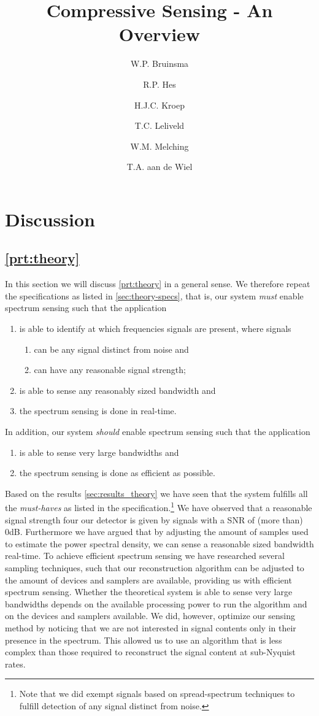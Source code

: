 \documentclass[a4paper, openany, oneside]{memoir}
\title{Compressive Sensing - An Overview}
\author{W.P. Bruinsma \and R.P. Hes \and H.J.C. Kroep \and T.C. Leliveld \and W.M. Melching \and T.A. aan de Wiel}
\begin{document}
\chapter{Discussion}

\section{\cref{prt:theory}}
In this section we will discuss \cref{prt:theory} in a general sense. We therefore repeat the specifications as listed
in \cref{sec:theory-specs}, that is, our system \emph{must} enable spectrum sensing such that the application
\begin{enumerate}
    \item is able to identify at which frequencies signals are present, where signals
    \begin{enumerate}
        \item can be any signal distinct from noise and
        \item can have any reasonable signal strength;
    \end{enumerate}
    \item is able to sense any reasonably sized bandwidth and
    \item the spectrum sensing is done in real-time.
\end{enumerate}
In addition, our system \emph{should} enable spectrum sensing such that the application
\begin{enumerate}
    \item is able to sense very large bandwidths and
    \item the spectrum sensing is done as efficient as possible.
\end{enumerate}

Based on the results \cref{sec:results_theory} we have seen that the system fulfills all the \emph{must-haves} as listed 
in the specification.\footnote{Note that we did exempt signals based on spread-spectrum techniques to fulfill detection of any signal distinct
from noise.} We have observed that a reasonable signal strength four our detector is given by signals with a SNR of (more than) 0dB. Furthermore we have argued that by adjusting the amount of samples used to estimate the power spectral density, we can sense a reasonable sized bandwidth real-time. To achieve efficient spectrum sensing we have researched several sampling techniques, such that our reconstruction algorithm can
be adjusted to the amount of devices and samplers are available, providing us with efficient spectrum sensing. Whether the theoretical system is able to sense very large bandwidths depends on the available processing power to run the algorithm and on the devices and samplers available. We did, however, optimize our sensing method by noticing that we are not interested in signal contents only in their presence in the spectrum. This allowed us to use an algorithm that is less complex than those required to reconstruct the signal content at sub-Nyquist rates.
\end{document}
